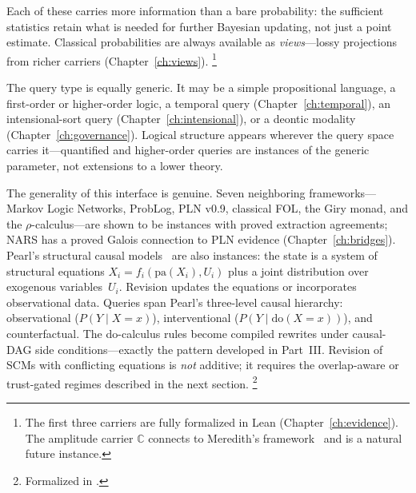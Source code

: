 \documentclass[11pt,openany]{report}
\begin{document}
\noindent
Each of these carries more information than a bare probability: the
sufficient statistics retain what is needed for further Bayesian
updating, not just a point estimate.  Classical probabilities are
always available as \emph{views}---lossy projections from richer
carriers (Chapter~\ref{ch:views}).%
\footnote{The first three carriers are fully formalized in Lean
(Chapter~\ref{ch:evidence}).  The amplitude carrier $\mathbb{C}$
connects to Meredith's framework~\cite{meredith2026ccc} and is a
natural future instance.}

\noindent
The query type is equally generic.  It may be a simple propositional
language, a first-order or higher-order logic, a temporal query
(Chapter~\ref{ch:temporal}), an intensional-sort query
(Chapter~\ref{ch:intensional}), or a deontic modality
(Chapter~\ref{ch:governance}).  Logical structure appears wherever
the query space carries it---quantified and higher-order queries are
instances of the generic  parameter, not extensions to a
lower theory.

The generality of this interface is genuine.  Seven neighboring
frameworks---Markov Logic Networks, ProbLog, PLN v0.9,
classical FOL, the Giry monad, and the $\rho$-calculus---are
shown to be  instances with proved
extraction agreements; NARS has a proved Galois connection
to PLN evidence (Chapter~\ref{ch:bridges}).
Pearl's structural
causal models~\cite{Pearl2009} are also  instances: the
state is a system of structural equations $X_i = f_i(\mathrm{pa}(X_i),
U_i)$ plus a joint distribution over exogenous variables~$U_i$.
Revision updates the equations or incorporates observational data.
Queries span Pearl's three-level causal hierarchy: observational
($P(Y \mid X = x)$), interventional ($P(Y \mid \mathrm{do}(X = x))$),
and counterfactual.  The do-calculus rules become compiled rewrites
under causal-DAG side conditions---exactly the pattern developed in
Part~III.  Revision of SCMs with conflicting equations
is \emph{not} additive; it requires the overlap-aware or trust-gated
regimes described in the next section.%
\footnote{Formalized in
.}

\end{document}
